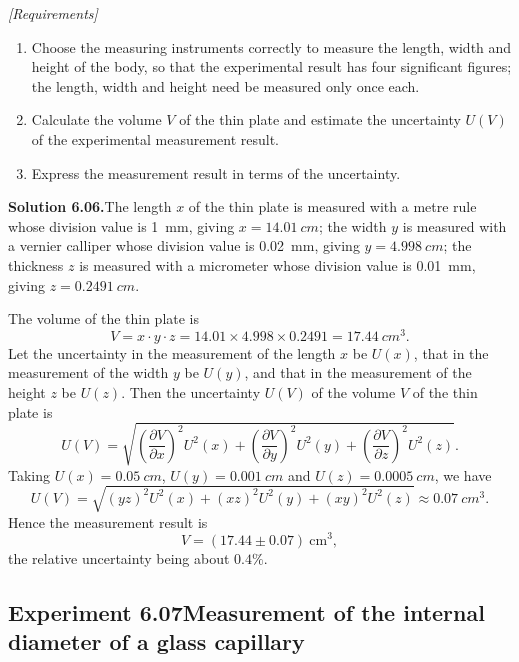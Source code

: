 \noindent\textit{[Requirements]}
\begin{enumerate}[label=(\arabic*),leftmargin=2.2em,itemsep=1pt,topsep=2pt]
\item Choose the measuring instruments correctly to measure the length, width and height of the body, so that the experimental result has four significant figures; the length, width and height need be measured only once each.
\item Calculate the volume $V$ of the thin plate and estimate the uncertainty $U(V)$ of the experimental measurement result.
\item Express the measurement result in terms of the uncertainty.
\end{enumerate}

\medskip
\noindent\textbf{Solution 6.06.}\quad The length $x$ of the thin plate is measured with a metre rule whose division value is \SI{1}{mm}, giving $x=\SI{14.01}{cm}$; the width $y$ is measured with a vernier calliper whose division value is \SI{0.02}{mm}, giving $y=\SI{4.998}{cm}$; the thickness $z$ is measured with a micrometer whose division value is \SI{0.01}{mm}, giving $z=\SI{0.2491}{cm}$.

The volume of the thin plate is
\begin{equation*}
V=x\cdot y\cdot z=14.01\times4.998\times0.2491=\SI{17.44}{cm^3}.
\end{equation*}
Let the uncertainty in the measurement of the length $x$ be $U(x)$, that in the measurement of the width $y$ be $U(y)$, and that in the measurement of the height $z$ be $U(z)$. Then the uncertainty $U(V)$ of the volume $V$ of the thin plate is
\begin{equation*}
U(V)=\sqrt{\left(\frac{\partial V}{\partial x}\right)^{2}U^{2}(x)
+\left(\frac{\partial V}{\partial y}\right)^{2}U^{2}(y)
+\left(\frac{\partial V}{\partial z}\right)^{2}U^{2}(z)}.
\end{equation*}
Taking $U(x)=\SI{0.05}{cm}$, $U(y)=\SI{0.001}{cm}$ and $U(z)=\SI{0.0005}{cm}$, we have
\begin{equation*}
U(V)=\sqrt{(yz)^{2}U^{2}(x)+(xz)^{2}U^{2}(y)+(xy)^{2}U^{2}(z)}
\approx\SI{0.07}{cm^3}.
\end{equation*}
Hence the measurement result is
\begin{equation*}
V=(17.44\pm0.07)\ \mathrm{cm^3},
\end{equation*}
the relative uncertainty being about $0.4\%$.

\subsection*{Experiment 6.07\quad Measurement of the internal diameter of a glass capillary}

